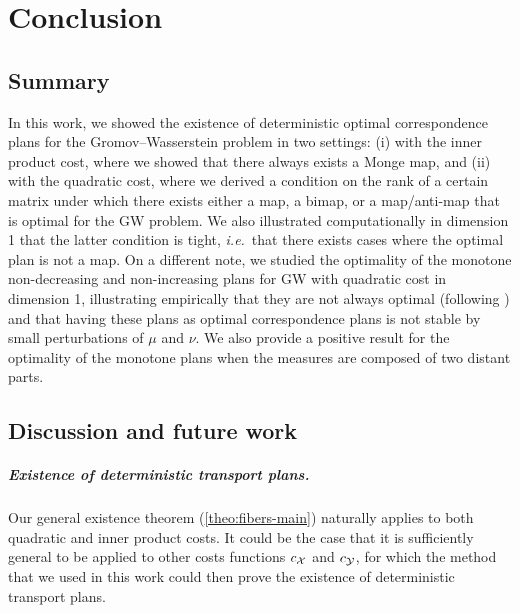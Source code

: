 
\chapter*{Conclusion}
\section*{Summary}
In this work, we showed the existence of deterministic optimal correspondence plans for the Gromov--Wasserstein problem in two settings: (i) with the inner product cost, where we showed that there always exists a Monge map, and (ii) with the quadratic cost, where we derived a condition on the rank of a certain matrix under which there exists either a map, a bimap, or a map/anti-map that is optimal for the GW problem. We also illustrated computationally in dimension 1 that the latter condition is tight, \textit{i.e.}~that there exists cases where the optimal plan is not a map. On a different note, we studied the optimality of the monotone non-decreasing and non-increasing plans for GW with quadratic cost in dimension 1, illustrating empirically that they are not always optimal (following \cite{beinert2022assignment}) and that having these plans as optimal correspondence plans is not stable by small perturbations of $\mu$ and $\nu$. We also provide a positive result for the optimality of the monotone plans when the measures are composed of two distant parts.

\section*{Discussion and future work}
\paragraph{Existence of deterministic transport plans.}
Our general existence theorem (\cref{theo:fibers-main}) naturally applies to both quadratic and inner product costs. It could be the case that it is sufficiently general to be applied to other costs functions $c_{\mathcal{X}}$ and $c_{\mathcal{Y}}$, for which the method that we used in this work could then prove the existence of deterministic transport plans.

